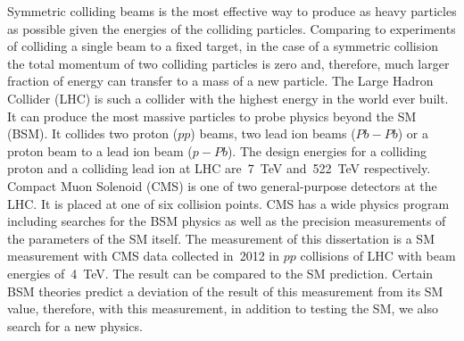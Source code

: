 Symmetric colliding beams is the most effective way to produce as heavy particles as possible given the energies of the colliding particles. Comparing to experiments of colliding a single beam to a fixed target, in the case of a symmetric collision the total momentum of two colliding particles is zero and, therefore, much larger fraction of energy can transfer to a mass of a new particle.  The Large Hadron Collider (LHC) is such a collider with the highest energy in the world ever built. It can produce the most massive particles to probe physics beyond the SM (BSM). It collides two proton ($pp$) beams, two lead ion beams ($Pb-Pb$) or a proton beam to a lead ion beam ($p-Pb$). The design energies for a colliding proton and a colliding lead ion at LHC are~7~TeV and~522~TeV respectively. \\

Compact Muon Solenoid (CMS) is one of two general-purpose detectors at the LHC. It is placed at one of six collision points. CMS has a wide physics program including searches for the BSM physics as well as the precision measurements of the parameters of the SM itself. The measurement of this dissertation is a SM measurement with CMS data collected in~2012 in $pp$ collisions of LHC with beam energies of~4~TeV. The result can be compared to the SM prediction. Certain BSM theories predict a deviation of the result of this measurement from its SM value, therefore, with this measurement, in addition to testing the SM, we also search for a new physics.\\


